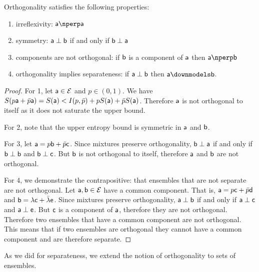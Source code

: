 \begin{mathSection}
\begin{prop}\label{pm-es-orthoProps}
	Orthogonality satisfies the following properties:
	\begin{enumerate}
		\item irreflexivity: $\ens[a] \northo \ens[a]$
		\item symmetry: $\ens[a] \ortho \ens[b]$ if and only if $\ens[b] \ortho \ens[a]$
		\item components are not orthogonal: if $\ens[b]$ is a component of $\ens[a]$ then $\ens[a] \northo \ens[b]$
		\item orthogonality implies separateness: if $\ens[a] \ortho \ens[b]$ then $\ens[a] \separate \ens[b]$.
	\end{enumerate}
\end{prop}

\begin{proof}
	For 1, let $\ens[a] \in \Ens$ and $p \in (0,1)$. We have $S(p\ens[a] + \bar{p}\ens[a]) = S(\ens[a]) < I(p,\bar{p}) + p S(\ens[a]) + \bar{p} S(\ens[a])$. Therefore $\ens[a]$ is not orthogonal to itself as it does not saturate the upper bound.
	
	For 2, note that the upper entropy bound is symmetric in $\ens[a]$ and $\ens[b]$.
	
	For 3, let $\ens[a] = p \ens[b] + \bar{p} \ens[c]$. Since mixtures preserve orthogonality, $\ens[b] \ortho \ens[a]$ if and only if $\ens[b] \ortho \ens[b]$ and $\ens[b] \ortho \ens[c]$. But $\ens[b]$ is not orthogonal to itself, therefore $\ens[a]$ and $\ens[b]$ are not orthogonal.
	
	For 4, we demonstrate the contrapositive: that ensembles that are not separate are not orthogonal. Let $\ens[a], \ens[b] \in \Ens$ have a common component. That is, $\ens[a] = p \ens[c] + \bar{p} \ens[d]$ and $\ens[b] = \lambda \ens[c] + \bar{\lambda} \ens[e]$. Since mixtures preserve orthogonality, $\ens[a] \ortho \ens[b]$ if and only if $\ens[a] \ortho \ens[c]$ and $\ens[a] \ortho \ens[e]$. But $\ens[c]$ is a component of $\ens[a]$, therefore they are not orthogonal. Therefore two ensembles that have a common component are not orthogonal. This means that if two ensembles are orthogonal they cannot have a common component and are therefore separate.
\end{proof}
\end{mathSection}

As we did for separateness, we extend the notion of orthogonality to sets of ensembles.


